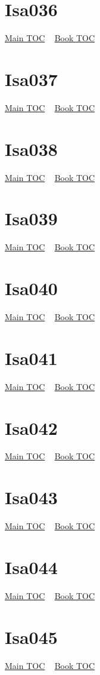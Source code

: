 \documentclass{book}
\begin{document}
  \section{Isa036}\hyperlink{toc}{Main TOC} ~ \hyperref[subsec:Isa]{Book TOC} 
  \section{Isa037}\hyperlink{toc}{Main TOC} ~ \hyperref[subsec:Isa]{Book TOC} 
  \section{Isa038}\hyperlink{toc}{Main TOC} ~ \hyperref[subsec:Isa]{Book TOC} 
  \section{Isa039}\hyperlink{toc}{Main TOC} ~ \hyperref[subsec:Isa]{Book TOC} 
  \section{Isa040}\hyperlink{toc}{Main TOC} ~ \hyperref[subsec:Isa]{Book TOC} 
  \section{Isa041}\hyperlink{toc}{Main TOC} ~ \hyperref[subsec:Isa]{Book TOC} 
  \section{Isa042}\hyperlink{toc}{Main TOC} ~ \hyperref[subsec:Isa]{Book TOC} 
  \section{Isa043}\hyperlink{toc}{Main TOC} ~ \hyperref[subsec:Isa]{Book TOC} 
  \section{Isa044}\hyperlink{toc}{Main TOC} ~ \hyperref[subsec:Isa]{Book TOC} 
  \section{Isa045}\hyperlink{toc}{Main TOC} ~ \hyperref[subsec:Isa]{Book TOC} 
\end{document}
